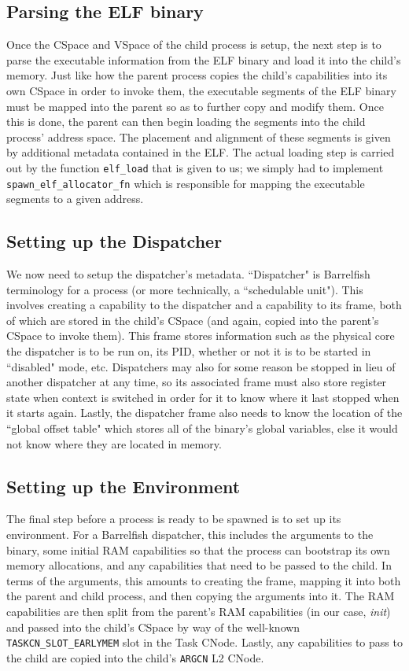 \subsection{Parsing the ELF binary}
Once the CSpace and VSpace of the child process is setup, the next step is to parse the executable information from the ELF binary and load it into the child's memory. Just like how the parent process copies the child's capabilities into its own CSpace in order to invoke them, the executable segments of the ELF binary must be mapped into the parent so as to further copy and modify them. Once this is done, the parent can then begin loading the segments into the child process' address space. The placement and alignment of these segments is given by additional metadata contained in the ELF. The actual loading step is carried out by the function \texttt{elf\_load} that is given to us; we simply had to implement \texttt{spawn\_elf\_allocator\_fn} which is responsible for mapping the executable segments to a given address.

\subsection{Setting up the Dispatcher}
We now need to setup the dispatcher's metadata. ``Dispatcher" is Barrelfish terminology for a process (or more technically, a ``schedulable unit"). This involves creating a capability to the dispatcher and a capability to its frame, both of which are stored in the child's CSpace (and again, copied into the parent's CSpace to invoke them). This frame stores information such as the physical core the dispatcher is to be run on, its PID, whether or not it is to be started in ``disabled" mode, etc. Dispatchers may also for some reason be stopped in lieu of another dispatcher at any time, so its associated frame must also store register state when context is switched in order for it to know where it last stopped when it starts again. Lastly, the dispatcher frame also needs to know the location of the ``global offset table" which stores all of the binary's global variables, else it would not know where they are located in memory.

\subsection{Setting up the Environment}
The final step before a process is ready to be spawned is to set up its environment. For a Barrelfish dispatcher, this includes the arguments to the binary, some initial RAM capabilities so that the process can bootstrap its own memory allocations, and any capabilities that need to be passed to the child. In terms of the arguments, this amounts to creating the frame, mapping it into both the parent and child process, and then copying the arguments into it. The RAM capabilities are then split from the parent's RAM capabilities (in our case, \textit{init}) and passed into the child's CSpace by way of the well-known \texttt{TASKCN\_SLOT\_EARLYMEM} slot in the Task CNode. Lastly, any capabilities to pass to the child are copied into the child's \texttt{ARGCN} L2 CNode. 

